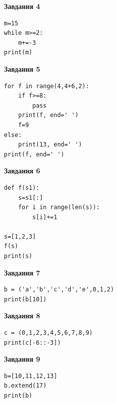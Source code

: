 \documentclass[12pt, ukrainian]{article}
\begin{document}
{{{{{{\begin{minipage}[t]{7.5cm}
\begin{center}
\textbf{Завдання 4}
\end{center}

\begin{verbatim}
m=15
while m>=2:
    m+=-3
print(m)
\end{verbatim}

\end{minipage}
\vline \hspace{6mm}
\begin{minipage}[t]{10.5cm}

\begin{center}
\textbf{Завдання 5}
\end{center}

\begin{verbatim}
for f in range(4,4+6,2):
    if f>=8:
        pass
    print(f, end=' ')
    f=9
else:
    print(13, end=' ')
print(f, end=' ')
\end{verbatim}



\begin{center}
\textbf{Завдання 6}
\end{center}

\begin{verbatim}
def f(s1):
    s=s1[:]
    for i in range(len(s)):
        s[i]+=1

s=[1,2,3]
f(s)
print(s)
\end{verbatim}



\begin{center}
\textbf{Завдання 7}
\end{center}

\begin{verbatim}
b = ('a','b','c','d','e',0,1,2)
print(b[10])
\end{verbatim}



\begin{center}
\textbf{Завдання 8}
\end{center}

\begin{verbatim}
c = (0,1,2,3,4,5,6,7,8,9)
print(c[-6::-3])
\end{verbatim}



\begin{center}
\textbf{Завдання 9}
\end{center}

\begin{verbatim}
b=[10,11,12,13]
b.extend(17)
print(b)
\end{verbatim}




\end{minipage}}}}}}}
\end{document}
